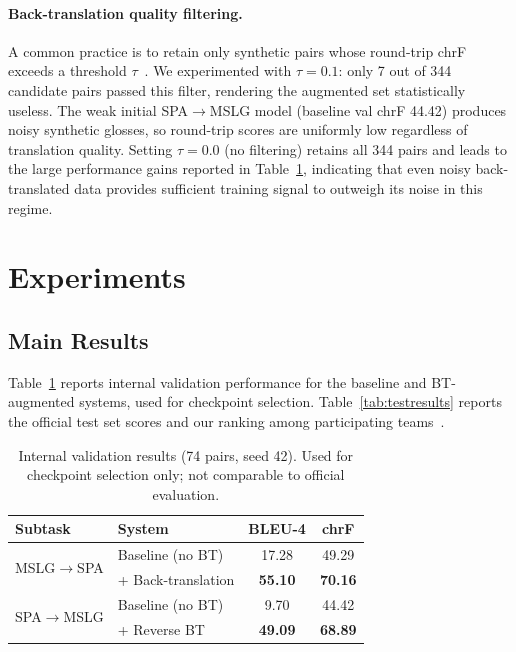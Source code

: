 \documentclass[sigconf,screen]{ceurart}
\begin{document}
\paragraph{Back-translation quality filtering.}
\label{sec:threshold}
A common practice is to retain only synthetic pairs whose round-trip
chrF exceeds a threshold $\tau$~\cite{caswell2019tagged}.
We experimented with $\tau = 0.1$: only 7 out of 344 candidate pairs
passed this filter, rendering the augmented set statistically useless.
The weak initial SPA$\!\to\!$MSLG model (baseline val chrF 44.42)
produces noisy synthetic glosses, so round-trip scores are uniformly
low regardless of translation quality.
Setting $\tau = 0.0$ (no filtering) retains all 344 pairs and leads
to the large performance gains reported in Table~\ref{tab:valresults},
indicating that even noisy back-translated data provides sufficient
training signal to outweigh its noise in this regime.

\section{Experiments}
\label{sec:experiments}

\subsection{Main Results}

Table~\ref{tab:valresults} reports internal validation performance for
the baseline and BT-augmented systems, used for checkpoint selection.
Table~\ref{tab:testresults} reports the official test set scores and
our ranking among participating teams~\cite{rodriguez2026overview}.

\begin{table}[h]
\centering
\caption{Internal validation results (74 pairs, seed 42).
  Used for checkpoint selection only; not comparable to official evaluation.}
\label{tab:valresults}
\begin{tabular}{llcc}
\toprule
\textbf{Subtask} & \textbf{System} & \textbf{BLEU-4} & \textbf{chrF} \\
\midrule
\multirow{2}{*}{MSLG$\!\to\!$SPA}
  & Baseline (no BT)   & 17.28 & 49.29 \\
  & + Back-translation & \textbf{55.10} & \textbf{70.16} \\
\midrule
\multirow{2}{*}{SPA$\!\to\!$MSLG}
  & Baseline (no BT)   & 9.70  & 44.42 \\
  & + Reverse BT       & \textbf{49.09} & \textbf{68.89} \\
\bottomrule
\end{tabular}
\end{table}
\end{document}
